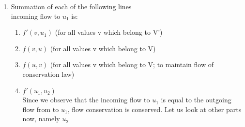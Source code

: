 \documentclass[11pt]{article}
\begin{document}
\begin{enumerate}
\begin{enumerate}
    \begin{enumerate}
        \item Summation of each of the following lines\\
        incoming flow to $u_1$ is: 
        \begin{enumerate}
            \item $f'(v, u_1)$ (for all values v which belong to V')
            \item $f(v, u)$ (for all values v which belong to V)
            \item $f(u, v)$ (for all values v which belong to V; to maintain flow of conservation law)
            \item $f'(u_1, u_2)$ \\Since we observe that the incoming flow to $u_1$ is equal to the outgoing flow from to $u_1$, flow conservation is conserved. Let us look at other parts now, namely $u_2$
        \end{enumerate}
    \end{enumerate}
    

\end{enumerate}
\end{enumerate}
\end{document}

